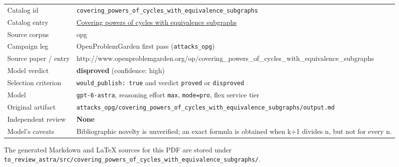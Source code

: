 \documentclass[
  11pt,
  a4paper,
]{article}
\newcounter{none} %
\begin{document}
{\def\LTcaptype{none} %
\begin{longtable}[]{@{}
  >{\raggedright\arraybackslash}p{}
  >{\raggedright\arraybackslash}p{}@{}}
\toprule\noalign{}
\endhead
\bottomrule\noalign{}
\endlastfoot
Catalog id &
\texttt{covering\_powers\_of\_cycles\_with\_equivalence\_subgraphs} \\
Catalog entry &
\href{https://graph-theory-ai.github.io/graph-conjectures/op/covering_powers_of_cycles_with_equivalence_subgraphs/}{Covering
powers of cycles with equivalence subgraphs} \\
Source corpus & opg \\
Campaign leg & OpenProblemGarden first pass (\texttt{attacks\_opg}) \\
Source paper / entry &
http://www.openproblemgarden.org/op/covering\_powers\_of\_cycles\_with\_equivalence\_subgraphs \\
Model verdict & \textbf{disproved} (confidence: high) \\
Selection criterion & \texttt{would\_publish:\ true} and verdict
\texttt{proved} or \texttt{disproved} \\
Model & \texttt{gpt-6-astra}, reasoning effort \texttt{max},
\texttt{mode=pro}, flex service tier \\
Original artifact &
\texttt{attacks\_opg/covering\_powers\_of\_cycles\_with\_equivalence\_subgraphs/output.md} \\
Independent review & \textbf{None} \\
Model's caveats & Bibliographic novelty is unverified; an exact formula
is obtained when k+1 divides n, but not for every n. \\
\end{longtable}
}

The generated Markdown and LaTeX sources for this PDF are stored under
\texttt{to\_review\_astra/src/covering\_powers\_of\_cycles\_with\_equivalence\_subgraphs/}.
\end{document}

